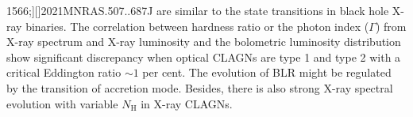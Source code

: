 1566;][]{2021MNRAS.507..687J} are similar to the state transitions in black hole X-ray binaries. The correlation between hardness ratio or the photon index ($\Gamma$) from X-ray spectrum and X-ray luminosity \citep[e.g., Mrk 1018;][]{2018MNRAS.480.3898N,2021MNRAS.506.4188L} and the bolometric luminosity distribution \citep[e.g., NGC 2992;][]{2021MNRAS.508..144G} show significant discrepancy when optical CLAGNs are type 1 and type 2 with a critical Eddington ratio $\sim 1$ per cent. The evolution of BLR might be regulated by the transition of accretion mode. Besides, there is also strong X-ray spectral evolution with variable $N_\mathrm{H}$ \citep[e.g., NGC 1365;][]{2021RAA....21..199L} in X-ray CLAGNs. 









